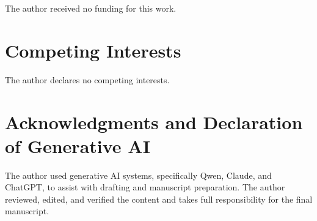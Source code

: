 \documentclass[12pt]{article}
\theoremstyle{definition}
\begin{document}
The author received no funding for this work.

\section*{Competing Interests}

The author declares no competing interests.

\section*{Acknowledgments and Declaration of Generative AI}

The author used generative AI systems, specifically Qwen, Claude, and
ChatGPT, to assist with drafting and manuscript preparation.  The author
reviewed, edited, and verified the content and takes full responsibility for
the final manuscript.
\end{document}
